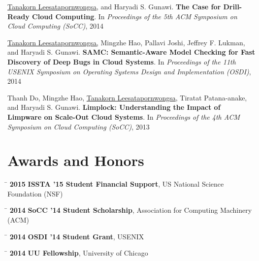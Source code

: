 \documentclass[10pt]{article} %
\begin{document}
\underline{Tanakorn Leesatapornwongsa,} and Haryadi S. Gunawi. \textbf{The Case
for Drill-Ready Cloud Computing}. In \textit{Proceedings of the 5th ACM
Symposium on Cloud Computing (SoCC)}, 2014
\vspace{2mm}

\underline{Tanakorn Leesatapornwongsa,} Mingzhe Hao, Pallavi Joshi, Jeffrey F.
Lukman, and Haryadi S. Gunawi. \textbf{SAMC: Semantic-Aware Model Checking for
Fast Discovery of Deep Bugs in Cloud Systems}. In \textit{Proceedings of the
11th USENIX Symposium on Operating Systems Design and Implementation (OSDI)},
2014
\vspace{2mm}

Thanh Do, Mingzhe Hao, \underline{Tanakorn Leesatapornwongsa}, Tiratat
Patana-anake, and Haryadi S. Gunawi. \textbf{Limplock: Understanding the Impact
of Limpware on Scale-Out Cloud Systems}. In \textit{Proceedings of the 4th ACM
Symposium on Cloud Computing (SoCC)}, 2013


\section{Awards and Honors}

\begin{tabbing}
\hspace{2.5cm} \= \kill
\textbf{2015} \> \textbf{ISSTA '15 Student Financial Support}, US National Science Foundation (NSF)
\end{tabbing}

\begin{tabbing}
\hspace{2.5cm} \= \kill
\textbf{2014} \> \textbf{SoCC '14 Student Scholarship}, Association for Computing Machinery (ACM)
\end{tabbing}

\begin{tabbing}
\hspace{2.5cm} \= \kill
\textbf{2014} \> \textbf{OSDI '14 Student Grant}, USENIX
\end{tabbing}

\begin{tabbing}
\hspace{2.5cm} \= \kill
\textbf{2014} \> \textbf{UU Fellowship}, University of Chicago
\end{tabbing}
\end{document}
